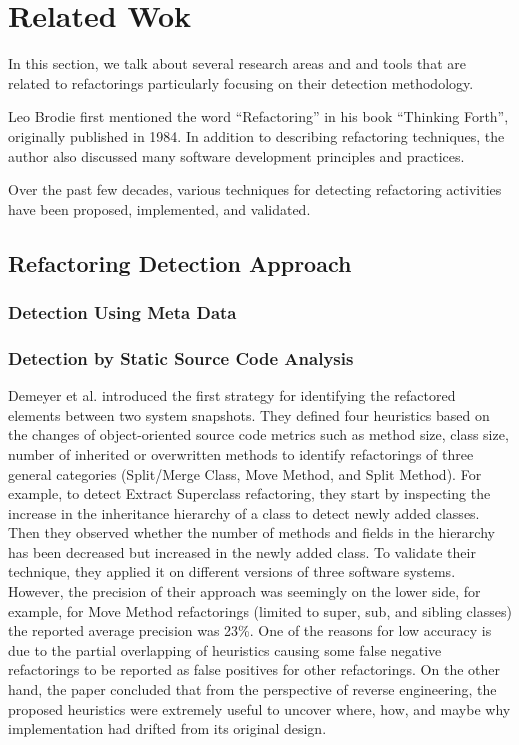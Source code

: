 \documentclass[letterpaper,12pt,onecolumn,final]{report}
\begin{document}
\chapter{Related Wok}
\label{chap:background}

In this section, we talk about several research areas and and tools that are related to refactorings particularly focusing on their detection methodology.

Leo Brodie \cite{thinkingforth} first mentioned the word “Refactoring” in his book “Thinking Forth”, originally published in 1984. In addition to describing refactoring techniques, the author also discussed many software development principles and practices. 

Over the past few decades, various techniques for detecting refactoring activities have been proposed, implemented, and validated.

\section{Refactoring Detection Approach}
\subsection{Detection Using Meta Data}
\subsection{Detection by Static Source Code Analysis}
Demeyer et al. \cite{Demeyer2000} introduced the first strategy for identifying the refactored elements between two system snapshots. They defined four heuristics based on the changes of object-oriented source code metrics such as method size, class size, number of inherited or overwritten methods to identify refactorings of three general categories (Split/Merge Class, Move Method, and Split Method). For example, to detect Extract Superclass refactoring, they start by inspecting the increase in the inheritance hierarchy of a class to detect newly added classes. Then they observed whether the number of methods and fields in the hierarchy has been decreased but increased in the newly added class. To validate their technique, they applied it on different versions of three software systems. However, the precision of their approach was seemingly on the lower side, for example, for Move Method refactorings (limited to super, sub, and sibling classes) the reported average precision was 23\%. One of the reasons for low accuracy is due to the partial overlapping of heuristics causing some false negative refactorings to be reported as false positives for other refactorings. On the other hand, the paper concluded that from the perspective of reverse engineering, the proposed heuristics were extremely useful to uncover where, how, and maybe why implementation had drifted from its original design.
\end{document}

